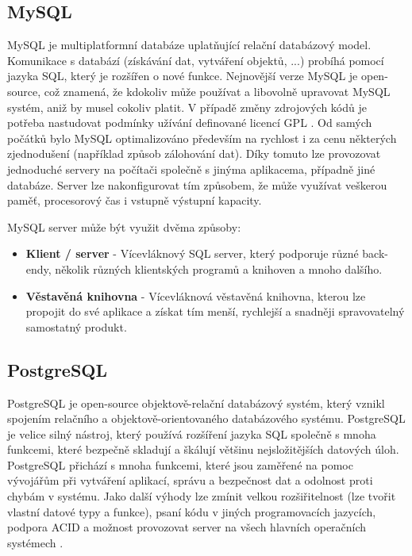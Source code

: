 \subsection{MySQL}
MySQL je multiplatformní databáze uplatňující relační databázový model. Komunikace s databází (získávání dat, vytváření objektů, ...) probíhá pomocí jazyka \gls{SQL}, který je rozšířen o nové funkce. Nejnovější verze MySQL je open-source, což znamená, že kdokoliv může používat a libovolně upravovat MySQL systém, aniž by musel cokoliv platit. V případě změny zdrojových kódů je potřeba nastudovat podmínky užívání definované licencí \gls{GPL} \cite{mysql}.
\newline
\indent Od samých počátků bylo MySQL optimalizováno především na rychlost i za cenu některých zjednodušení (například způsob zálohování dat). Díky tomuto lze provozovat jednoduché servery na počítači společně s jinýma aplikacema, případně jiné databáze. Server lze nakonfigurovat tím způsobem, že může využívat veškerou paměť, procesorový čas i vstupně výstupní kapacity.
\newline

\noindent MySQL server může být využit dvěma způsoby:
\begin{itemize}
\item \textbf{Klient / server} - Vícevláknový \gls{SQL} server, který podporuje různé back-endy, několik různých klientských programů a knihoven a mnoho dalšího.
\item \textbf{Věstavěná knihovna} - Vícevláknová věstavěná knihovna, kterou lze propojit do své aplikace a získat tím menší, rychlejší a snadněji spravovatelný samostatný produkt.
\end{itemize}
\subsection{PostgreSQL}
PostgreSQL je open-source objektově-relační databázový systém, který vznikl spojením relačního a objektově-orientovaného databázového systému. PostgreSQL je velice silný nástroj, který používá rozšíření jazyka \gls{SQL} společně s mnoha funkcemi, které bezpečně skladují a škálují většinu nejsložitějších datových úloh.
\newline
\indent PostgreSQL přichází s mnoha funkcemi, které jsou zaměřené na pomoc vývojářům při vytváření aplikací, správu a bezpečnost dat a odolnost proti chybám v systému. Jako další výhody lze zmínit velkou rozšiřitelnost (lze tvořit vlastní datové typy a funkce), psaní kódu v jiných programovacích jazycích, podpora \gls{ACID} a možnost provozovat server na všech hlavních operačních systémech \cite{postgres}.
\newline


